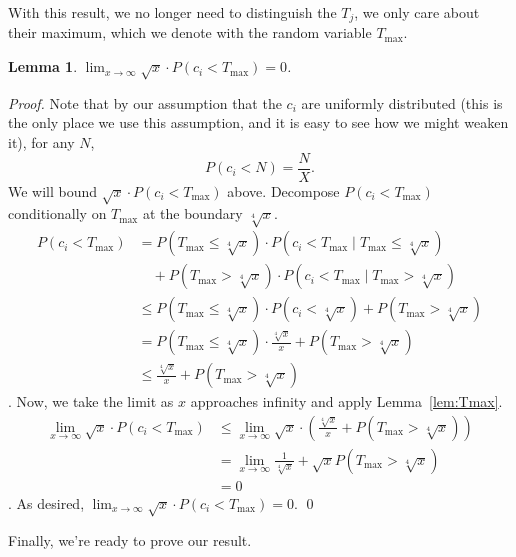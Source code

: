 \documentclass[11pt]{article}
\newtheorem{lemma}[theorem]{Lemma}
\theoremstyle{definition}
\begin{document}
With this result, we no longer need to distinguish the $T_j$, we only care about their maximum, which we denote with the random
variable $T_{\max}$.

\begin{lemma}
    \label{lem:pi}
$\lim_{x\rightarrow \infty} \sqrt{x} \cdot P\left(c_i < T_{\max}\right) = 0$.
\end{lemma}
\begin{proof}
Note that by our assumption that the $c_i$ are uniformly distributed (this is the only place we use this assumption,
and it is easy to see how we might weaken it), for any $N$,
\[P\left(c_i < N\right) = \frac{N}{X}.\] 
We will bound $\sqrt{x} \cdot P\left(c_i < T_{\max}\right)$ above.  Decompose $P\left(c_i < T_{\max}\right)$ conditionally on $T_{\max}$ at the boundary
$\sqrt[4]{x}$.
\begin{align}
P\left(c_i < T_{\max}\right) &= P\left(T_{\max} \le \sqrt[4]{x}\right)\cdot P\left(c_i < T_{\max} \mid T_{\max} \le \sqrt[4]{x}\right) \\
&\quad + P\left(T_{\max} > \sqrt[4]{x}\right)\cdot P\left(c_i < T_{\max} \mid T_{\max} > \sqrt[4]{x}\right) \\
&\le  P\left(T_{\max} \le \sqrt[4]{x}\right)\cdot P\left(c_i < \sqrt[4]{x}\right) + P\left(T_{\max} > \sqrt[4]{x}\right) \\
&= P\left(T_{\max} \le \sqrt[4]{x}\right)\cdot \frac{\sqrt[4]{x}}{x} + P\left(T_{\max} > \sqrt[4]{x}\right) \\
&\le \frac{\sqrt[4]{x}}{x} + P\left(T_{\max} > \sqrt[4]{x}\right) 
\end{align}.
Now, we take the limit as $x$ approaches infinity and apply Lemma~\ref{lem:Tmax}.
\begin{align}
\lim_{x\rightarrow \infty} \sqrt{x} \cdot P\left(c_i < T_{\max}\right) &\le \lim_{x\rightarrow \infty} \sqrt{x} 
\cdot \left(\frac{\sqrt[4]{x}}{x} + P\left(T_{\max} > \sqrt[4]{x}\right)\right) \\
&= \lim_{x\rightarrow \infty}\frac{1}{\sqrt[4]{x}} + \sqrt{x}P\left(T_{\max} > \sqrt[4]{x}\right) \\
&= 0
\end{align}.
As desired, $\lim_{x\rightarrow \infty} \sqrt{x} \cdot P\left(c_i < T_{\max}\right) = 0$. \qed
\end{proof}

Finally, we're ready to prove our result. 
\end{document}

